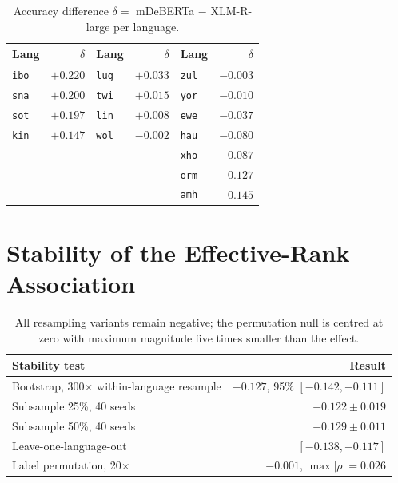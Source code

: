 \documentclass[11pt]{article}
\begin{document}
\begin{table}[h]
\centering
\small
\begin{tabular}{lrlrlr}
\toprule
Lang & $\delta$ & Lang & $\delta$ & Lang & $\delta$ \\
\midrule
\texttt{ibo} & $+0.220$ & \texttt{lug} & $+0.033$ & \texttt{zul} & $-0.003$ \\
\texttt{sna} & $+0.200$ & \texttt{twi} & $+0.015$ & \texttt{yor} & $-0.010$ \\
\texttt{sot} & $+0.197$ & \texttt{lin} & $+0.008$ & \texttt{ewe} & $-0.037$ \\
\texttt{kin} & $+0.147$ & \texttt{wol} & $-0.002$ & \texttt{hau} & $-0.080$ \\
             &          &              &          & \texttt{xho} & $-0.087$ \\
             &          &              &          & \texttt{orm} & $-0.127$ \\
             &          &              &          & \texttt{amh} & $-0.145$ \\
\bottomrule
\end{tabular}
\caption{Accuracy difference $\delta=$ mDeBERTa $-$ XLM-R-large per language.}
\label{tab:perlang}
\end{table}

\section{Stability of the Effective-Rank Association}
\label{app:stability}

\begin{table}[h]
\centering
\small
\begin{tabular}{lr}
\toprule
Stability test & Result \\
\midrule
Bootstrap, 300$\times$ within-language resample & $-0.127$, 95\% $[-0.142,-0.111]$ \\
Subsample 25\%, 40 seeds & $-0.122 \pm 0.019$ \\
Subsample 50\%, 40 seeds & $-0.129 \pm 0.011$ \\
Leave-one-language-out & $[-0.138, -0.117]$ \\
Label permutation, 20$\times$ & $-0.001$, $\max|\rho| = 0.026$ \\
\bottomrule
\end{tabular}
\caption{All resampling variants remain negative; the permutation null is
centred at zero with maximum magnitude five times smaller than the effect.}
\label{tab:stability}
\end{table}
\end{document}
